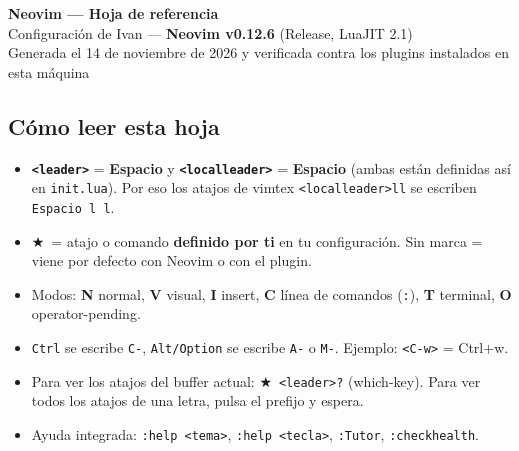 \documentclass[8pt,a4paper,landscape]{extarticle}
\newcommand{\kk}[1]{\texttt{#1}}
\newcommand{\ld}{\texttt{<leader>}}
\newcommand{\lld}{\texttt{<localleader>}}
\newcommand{\mk}{\textcolor{mine}{$\bigstar$}}   %
\let\oldsubsection\subsection
\renewcommand{\subsection}{\Needspace{9\baselineskip}\oldsubsection}
\begin{document}
\begin{center}
{\Huge\bfseries\color{accent} Neovim --- Hoja de referencia}\\[0.4em]
{\large Configuración de Ivan --- \textbf{Neovim v0.12.6} (Release, LuaJIT 2.1)}\\[0.2em]
{\small Generada el 14 de noviembre de 2026 y verificada contra los plugins instalados en esta máquina}
\end{center}

\subsection*{Cómo leer esta hoja}
\begin{itemize}
  \item \textbf{\ld} = \textbf{Espacio} y \textbf{\lld} = \textbf{Espacio} (ambas están definidas así en \kk{init.lua}). Por eso los atajos de vimtex \kk{\lld ll} se escriben \kk{Espacio l l}.
  \item \mk\ = atajo o comando \textbf{definido por ti} en tu configuración. Sin marca = viene por defecto con Neovim o con el plugin.
  \item Modos: \textbf{N} normal, \textbf{V} visual, \textbf{I} insert, \textbf{C} línea de comandos (\kk{:}), \textbf{T} terminal, \textbf{O} operator-pending.
  \item \kk{Ctrl} se escribe \kk{C-}, \kk{Alt/Option} se escribe \kk{A-} o \kk{M-}. Ejemplo: \kk{<C-w>} = Ctrl+w.
  \item Para ver los atajos del buffer actual: \mk\ \kk{\ld ?} (which-key). Para ver todos los atajos de una letra, pulsa el prefijo y espera.
  \item Ayuda integrada: \kk{:help <tema>}, \kk{:help <tecla>}, \kk{:Tutor}, \kk{:checkhealth}.
\end{itemize}
\end{document}
